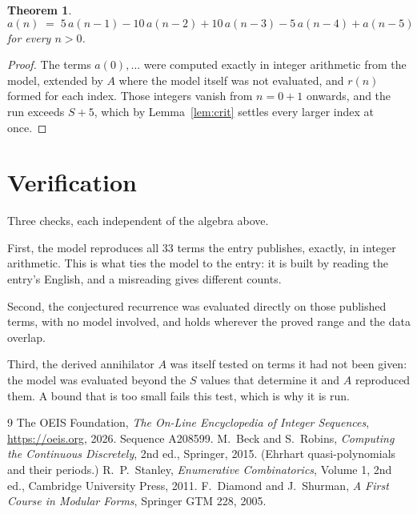 \documentclass[11pt,a4paper]{article}
\theoremstyle{plain}
\newtheorem{theorem}{Theorem}
\theoremstyle{definition}
\begin{document}
\begin{theorem}
\[
a(n)\;=\;5\,a(n-1) - 10\,a(n-2) + 10\,a(n-3) - 5\,a(n-4) + a(n-5)
\]
for every $n>0$.
\end{theorem}

\begin{proof}
The terms $a(0),\dots$ were computed exactly in integer arithmetic from the model, extended by
$A$ where the model itself was not evaluated, and $r(n)$ formed for each index. Those integers
vanish from $n=0+1$ onwards, and the run exceeds $S+5$, which by
Lemma~\ref{lem:crit} settles every larger index at once.
\end{proof}

\section{Verification}

Three checks, each independent of the algebra above.

First, the model reproduces all $33$ terms the entry publishes, exactly, in integer
arithmetic. This is what ties the model to the entry: it is built by reading the entry's
English, and a misreading gives different counts.

Second, the conjectured recurrence was evaluated directly on those published terms, with no
model involved, and holds wherever the proved range and the data overlap.

Third, the derived annihilator $A$ was itself tested on terms it had not been given: the model
was evaluated beyond the $S$ values that determine it and $A$ reproduced them. A bound that is
too small fails this test, which is why it is run.

\begin{thebibliography}{9}
 The OEIS Foundation, \emph{The On-Line Encyclopedia of Integer
Sequences}, \url{https://oeis.org}, 2026. Sequence A208599.
 M.~Beck and S.~Robins, \emph{Computing the Continuous Discretely},
2nd ed., Springer, 2015. (Ehrhart quasi-polynomials and their periods.)
 R.~P.~Stanley, \emph{Enumerative Combinatorics}, Volume 1, 2nd ed.,
Cambridge University Press, 2011.
 F.~Diamond and J.~Shurman, \emph{A First Course in Modular Forms},
Springer GTM 228, 2005.
\end{thebibliography}
\end{document}
